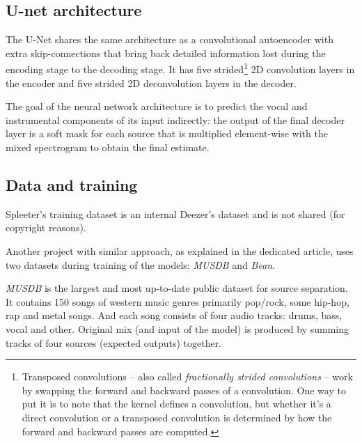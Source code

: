 \subsection{U-net architecture}\label{subsec:music-source-separation:u-net-architecture}
The U-Net shares the same architecture as a convolutional autoencoder with extra skip-connections that bring back
detailed information lost during the encoding stage to the decoding stage. It has five strided\footnote{Transposed
convolutions – also called \textit{fractionally strided convolutions} – work by swapping the forward and backward passes
of a convolution. One way to put it is to note that the kernel defines a convolution, but whether it’s a direct
convolution or a transposed convolution is determined by how the forward and backward passes are
computed.\cite{dumoulin2016guide}} 2D convolution layers in the encoder and five strided 2D deconvolution layers in
the decoder.

The goal of the neural network architecture is to predict the vocal and instrumental components of its input indirectly:
the output of the final decoder layer is a soft mask for each source that is multiplied element-wise with the mixed
spectrogram to obtain the final estimate.


\subsection{Data and training}\label{subsec:music-source-separation:data-and-training}

Spleeter's training dataset is an internal Deezer's dataset and is not shared (for copyright reasons).

Another project with similar approach, as explained in the dedicated article\cite{singing-voice-separation-article},
uses two datasets during training of the models: \textit{MUSDB} and \textit{Bean}.

\textit{MUSDB}\cite{musdb18} is the largest and most up-to-date public dataset for source separation. It contains 150
songs of western music genres primarily pop/rock, some hip-hop, rap and metal songs. And each song consists of four
audio tracks: drums, bass, vocal and other. Original mix (and input of the model) is produced by summing tracks of four
sources (expected outputs) together.

